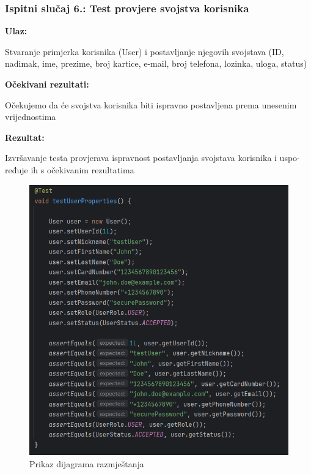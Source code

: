                                                                       
           


            \subsubsection{Ispitni slučaj 6.: Test provjere svojstva korisnika}
            
            \noindent\textbf{Ulaz:}
            \begin{packed_item}
            	\item Stvaranje primjerka korisnika (User) i postavljanje njegovih svojstava (ID, nadimak, ime, prezime, broj kartice, e-mail, broj telefona, lozinka, uloga, status)
            \end{packed_item}
            
            \noindent\textbf{Očekivani rezultati:}
            \begin{packed_item}
            	\item Očekujemo da će svojstva korisnika biti ispravno postavljena prema unesenim vrijednostima
            \end{packed_item}
            \noindent\textbf{Rezultat:}
            \begin{packed_item}
            	\item  Izvršavanje testa provjerava ispravnost postavljanja svojstava korisnika i uspo- ređuje ih s očekivanim rezultatima
            \end{packed_item}

				\begin{figure} [H]
					\centering
					\includegraphics[width=0.7\linewidth]{slike/UserTest.png}
					\caption{Prikaz dijagrama razmještanja}
					\label{fig:Prikaz dijagrama razmještanja}
				\end{figure}

